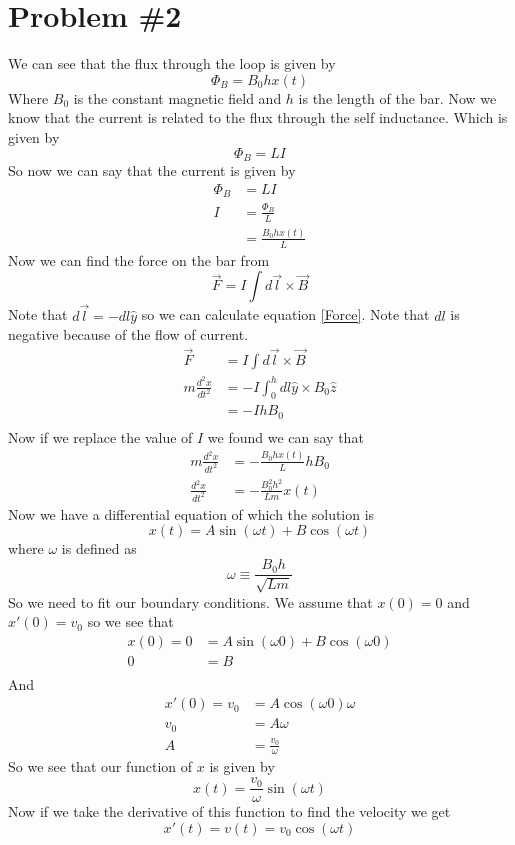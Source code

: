 \documentclass[11pt]{article}
\numberwithin{equation}{section}
\begin{document}
\section{Problem \#2}
We can see that the flux through the loop is given by 
$$\Phi_B = B_0hx(t)$$
Where $B_0$ is the constant magnetic field and $h$ is the length of the bar. Now we know that the current is related to the flux through the self inductance. Which is given by
\begin{equation}
\Phi_B = LI
\label{SelfInd}
\end{equation}
So now we can say that the current is given by
\begin{align*}
\Phi_B &= LI\\
I &= \frac{\Phi_B}{L}\\
&= \frac{B_0hx(t)}{L}
\end{align*}
Now we can find the force on the bar from 
\begin{equation}
\vec{F} = I \int d\vec{l}\times\vec{B}
\label{Force}
\end{equation}
Note that $d\vec{l}=-dl\hat{y}$ so we can calculate equation \ref{Force}. Note that $dl$ is negative because of the flow of current.
\begin{align*}
\vec{F} &= I \int d\vec{l}\times\vec{B}\\
m\frac{d^2x}{dt^2} &= -I \int_0^h dl\hat{y}\times B_0\hat{z}\\
&= -I hB_0\\
\end{align*}
Now if we replace the value of $I$ we found we can say that
\begin{align*}
m\frac{d^2x}{dt^2} &= -\frac{B_0hx(t)}{L} hB_0\\
\frac{d^2x}{dt^2} &= -\frac{B_0^2h^2}{Lm}x(t)
\end{align*}
Now we have a differential equation of which the solution is 
$$x(t) = A\sin(\omega t)+B\cos(\omega t)$$
where $\omega$ is defined as
$$\omega\equiv\frac{B_0h}{\sqrt{Lm}}$$
So we need to fit our boundary conditions. We assume that $x(0) = 0$ and $x'(0) = v_0$ so we see that
\begin{align*}
x(0) = 0 &= A\sin(\omega 0)+B\cos(\omega 0)\\
0 &= B\\
\end{align*}
And
\begin{align*}
x'(0) = v_0 &= A\cos(\omega 0)\omega\\
v_0 &= A\omega\\
A &= \frac{v_0}{\omega}
\end{align*}
So we see that our function of $x$ is given by
$$x(t) = \frac{v_0}{\omega}\sin(\omega t)$$
Now if we take the derivative of this function to find the velocity we get
$$x'(t) = v(t) = v_0\cos(\omega t)$$
\end{document}
